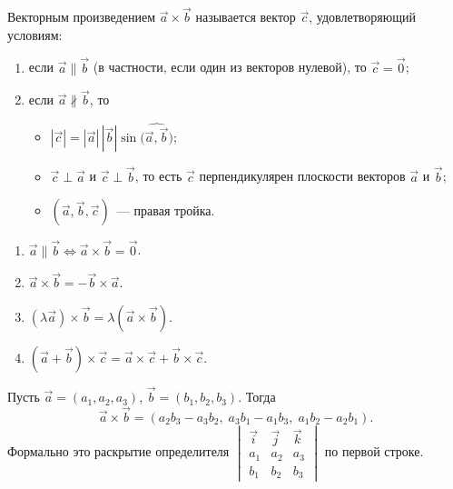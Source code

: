 \documentclass[12pt]{article}
\begin{document}
    \begin{definition}
    	Векторным произведением $\vec{a} \times \vec{b}$ называется вектор $\vec{c}$, удовлетворяющий условиям:
    	\begin{enumerate}
    		\item если $\vec{a} \parallel \vec{b}$ (в частности, если один из векторов нулевой), то $\vec{c} = \vec{0}$;
    		\item если $\vec{a} \nparallel \vec{b}$, то
    		\begin{itemize}
    			\item $|\vec{c}| = |\vec{a}| \, |\vec{b}| \sin \bigl( \widehat{\vec{a}, \vec{b}} \bigr)$;
    			\item $\vec{c} \perp \vec{a}$ и $\vec{c} \perp \vec{b}$, то есть $\vec{c}$ перпендикулярен плоскости векторов $\vec{a}$ и $\vec{b}$;
    			\item $(\vec{a}, \vec{b}, \vec{c})$~--- правая тройка.
    		\end{itemize}
    	\end{enumerate}
    \end{definition}
    
    \begin{properties}
    	\begin{enumerate}
    		\item $\vec{a} \parallel \vec{b} \Leftrightarrow \vec{a} \times \vec{b} = \vec{0}$.
    		\item $\vec{a} \times \vec{b} = - \vec{b} \times \vec{a}$.
    		\item $(\lambda \vec{a}) \times \vec{b} = \lambda (\vec{a} \times \vec{b})$.
    		\item $(\vec{a} + \vec{b}) \times \vec{c} = \vec{a} \times \vec{c} + \vec{b} \times \vec{c}$.
    	\end{enumerate}
    \end{properties}
    
    \begin{statement}
    	Пусть $\vec{a} = (a_1, a_2, a_3)$, $\vec{b} = (b_1, b_2, b_3)$. Тогда
    	\[
    		\vec{a} \times \vec{b} = (a_2b_3 - a_3b_2, \; a_3b_1 - a_1b_3, \; a_1b_2 - a_2b_1).
    	\]
    	Формально это раскрытие определителя
    	$\begin{vmatrix}
    		\vec{i} & \vec{j} & \vec{k} \\
    		a_1 & a_2 & a_3 \\
    		b_1 & b_2 & b_3
    	\end{vmatrix}$ по первой строке.
    \end{statement}
    
\end{document}
